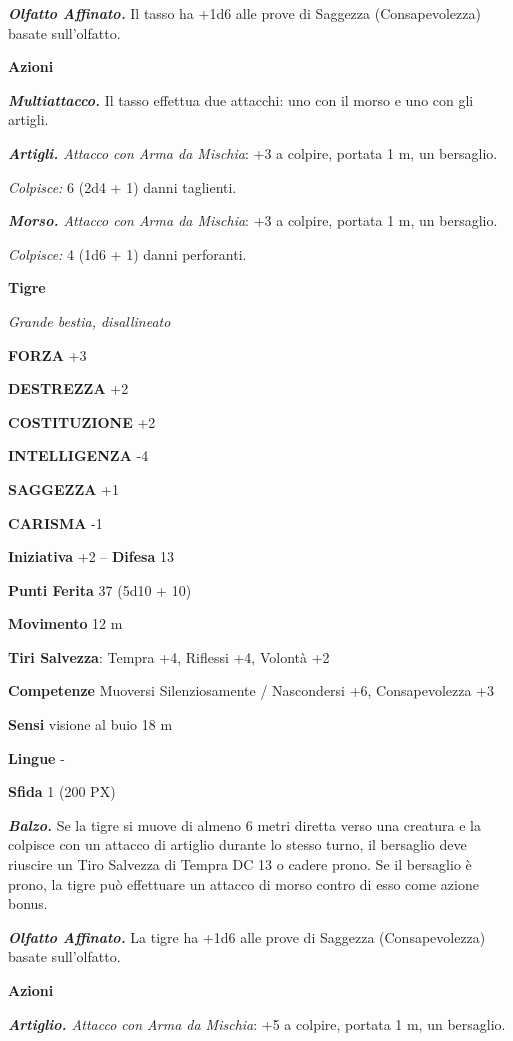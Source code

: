 \begin{multicols}{2}
\textit{\textbf{Olfatto Affinato.}} Il tasso ha +1d6 alle prove di Saggezza (Consapevolezza) basate sull'olfatto.

\textbf{Azioni}

\textit{\textbf{Multiattacco.}} Il tasso effettua due attacchi: uno con il morso e uno con gli artigli.

\textit{\textbf{Artigli.} Attacco con Arma da Mischia}: +3 a colpire, portata 1 m, un bersaglio.

\textit{Colpisce:} 6 (2d4 + 1) danni taglienti.

\textit{\textbf{Morso.} Attacco con Arma da Mischia}: +3 a colpire, portata 1 m, un bersaglio.

\textit{Colpisce:} 4 (1d6 + 1) danni perforanti.

\medskip\textbf{Tigre}

\textit{Grande bestia, disallineato}

\textbf{FORZA} +3

\textbf{DESTREZZA} +2

\textbf{COSTITUZIONE} +2

\textbf{INTELLIGENZA} -4

\textbf{SAGGEZZA} +1

\textbf{CARISMA} -1

\textbf{Iniziativa} +2 -- \textbf{Difesa} 13

\textbf{Punti Ferita} 37 (5d10 + 10)

\textbf{Movimento} 12 m

\textbf{Tiri Salvezza}: Tempra +4, Riflessi +4, Volontà +2

\textbf{Competenze} Muoversi Silenziosamente / Nascondersi +6, Consapevolezza +3

\textbf{Sensi} visione al buio 18 m

\textbf{Lingue} -

\textbf{Sfida} 1 (200 PX)

\textit{\textbf{Balzo.}} Se la tigre si muove di almeno 6 metri diretta verso una creatura e la colpisce con un attacco di artiglio durante lo stesso turno, il bersaglio deve riuscire un Tiro Salvezza di Tempra DC 13 o cadere prono. Se il bersaglio è prono, la tigre può effettuare un attacco di morso contro di esso come azione bonus.

\textit{\textbf{Olfatto Affinato.}} La tigre ha +1d6 alle prove di Saggezza (Consapevolezza) basate sull'olfatto.

\textbf{Azioni}

\textit{\textbf{Artiglio.} Attacco con Arma da Mischia}: +5 a colpire, portata 1 m, un bersaglio.


\end{multicols}
